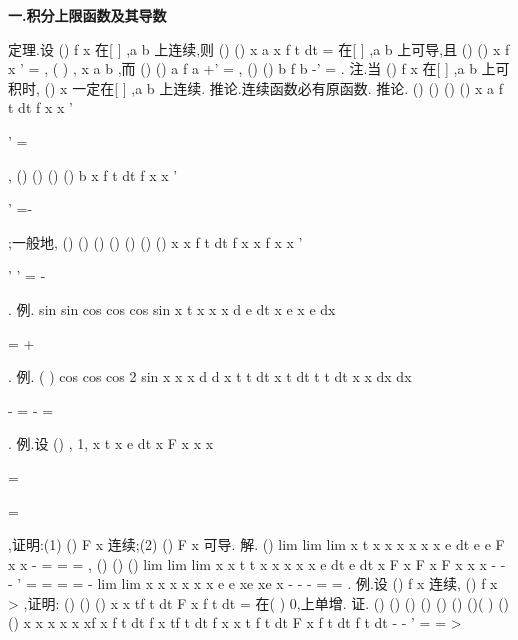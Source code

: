\vspace{4pt}
{\bfseries \textcolor{lyred}{一.积分上限函数及其导数}}

\textcolor{lyred}{定理}.设
()
f x 在[
]
,a b 上连续,则
()
()
x
a
x
f t dt
\Phi 
=\int 
在[
]
,a b 上可导,且 
()
()
x
f x
'
\Phi 
=
,
(
)
,
x
a b
\forall \in 
,而
()
()
a
f a
+'
\Phi 
=
,
()
()
b
f b
-'
\Phi 
=
. 
\textcolor{lyred}{注}.当
()
f x 在[
]
,a b 上可积时,
()
x
\Phi 
一定在[
]
,a b 上连续. 
\textcolor{lyred}{推论}.连续函数必有原函数. 
\textcolor{lyred}{推论}.
()
()
()
()
x
a
f t dt
f
x
x
\varphi 
\varphi 
\varphi 
'


'
=
\cdots 










\int 
,
()
()
()
()
b
x
f t dt
f
x
x
\zeta 
\zeta 
\zeta 
'


'
=-
\cdots 










\int 
;一般地, 
()
()
()
()
()
()
()
x
x
f t dt
f
x
x
f
x
x
\varphi 
\zeta 
\varphi 
\varphi 
\zeta 
\zeta 
'


'
'
=
\cdots 
-
\cdots 














\int 
. 
\textcolor{lyred}{例}.
sin
sin
cos
cos
cos
sin
x
t
x
x
x
d
e dt
x e
x e
dx

=
\cdots 
+
\cdots 




\int 
. 
\textcolor{lyred}{例}.
(
)
cos
cos
cos
2 sin
x
x
x
d
d
x
t
t dt
x
t dt
t
t dt
x
x
dx
dx




-
\cdots 
=
\cdots 
-
\cdots 
=








\int 
\int 
\int 
. 
\textcolor{lyred}{例}.设
()
,
1,
x
t
x
e dt
x
F x
x
x

\neq 

=

=

\int 
,证明:(1)
()
F x 连续;(2)
()
F x 可导. 
解.
()
lim
lim
lim
x
t
x
x
x
x
x
x
e dt
e
e
F x
x
\to 
\to 
\to 
-
=
=
=
\int 
, 
()
()
()
lim
lim
lim
x
x
t
t
x
x
x
x
x
e dt
e dt
x
F x
F
x
F
x
x
x
\to 
\to 
\to 
-
-
-
'
=
=
=
=
-
\int 
\int 
lim
lim
x
x
x
x
x
x
e
e
xe
xe
x
\to 
\to 
-
-
-
=
=
. 
\textcolor{lyred}{例}.设
()
f x 连续,
()
f x >
,证明:
()
()
()
x
x
tf t dt
F x
f t dt
=\int 
\int 
在(
)
0,\infty 上单增. 
证.
()
()
()
()
()
()
()(
)
()
()
x
x
x
x
x
xf x
f t dt
f x
tf t dt
f x
x
t f t dt
F
x
f t dt
f t dt
-
-
'
=
=
>












